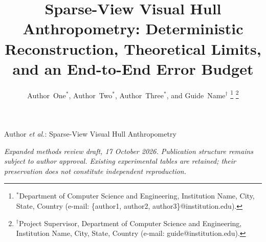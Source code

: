 \documentclass[journal]{IEEEtran}
\begin{document}
\title{Sparse-View Visual Hull Anthropometry: Deterministic Reconstruction, Theoretical Limits, and an End-to-End Error Budget}

\author{Author~One$^*$, Author~Two$^*$, Author~Three$^*$, and Guide~Name$^\dagger$%
\thanks{$^*$Department of Computer Science and Engineering, Institution Name, City, State, Country (e-mail: \{author1, author2, author3\}@institution.edu).}%
\thanks{$^\dagger$Project Supervisor, Department of Computer Science and Engineering, Institution Name, City, State, Country (e-mail: guide@institution.edu).}}

%
{Author \MakeLowercase{\textit{et al.}}: Sparse-View Visual Hull Anthropometry}

\maketitle

\begin{center}\small\textit{Expanded methods review draft, 17 October 2026. Publication structure remains subject to author approval. Existing experimental tables are retained; their preservation does not constitute independent reproduction.}\end{center}
\end{document}
